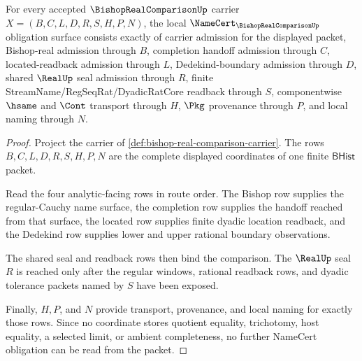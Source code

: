 \begin{theorem}
\label{thm:bishop-real-comparison-namecert-obligations}
For every accepted $\BishopRealComparisonUp$ carrier $X=(B,C,L,D,R,S,H,P,N)$, the local $\NameCert_{\BishopRealComparisonUp}$ obligation surface consists exactly of carrier admission for the displayed packet, Bishop-real admission through $B$, completion handoff admission through $C$, located-readback admission through $L$, Dedekind-boundary admission through $D$, shared $\RealUp$ seal admission through $R$, finite StreamName/RegSeqRat/DyadicRatCore readback through $S$, componentwise $\hsame$ and $\Cont$ transport through $H$, $\Pkg$ provenance through $P$, and local naming through $N$.
\end{theorem}
\begin{proof}
Project the carrier of \autoref{def:bishop-real-comparison-carrier}. The rows $B,C,L,D,R,S,H,P,N$ are the complete displayed coordinates of one finite $\mathsf{BHist}$ packet.

Read the four analytic-facing rows in route order. The Bishop row supplies the regular-Cauchy name surface, the completion row supplies the handoff reached from that surface, the located row supplies finite dyadic location readback, and the Dedekind row supplies lower and upper rational boundary observations.

The shared seal and readback rows then bind the comparison. The $\RealUp$ seal $R$ is reached only after the regular windows, rational readback rows, and dyadic tolerance packets named by $S$ have been exposed.

Finally, $H,P$, and $N$ provide transport, provenance, and local naming for exactly those rows. Since no coordinate stores quotient equality, trichotomy, host equality, a selected limit, or ambient completeness, no further NameCert obligation can be read from the packet.
\end{proof}

